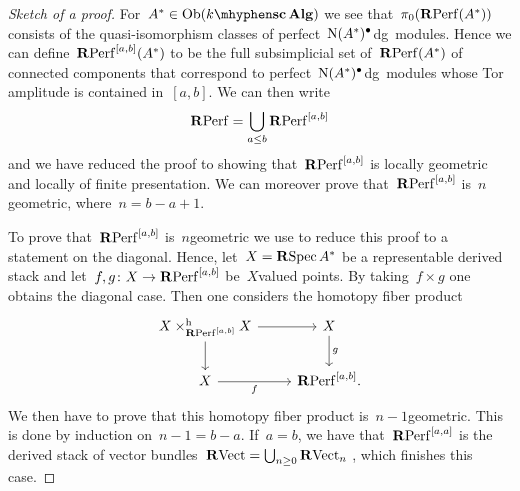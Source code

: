 \begin{refsection}
\begin{theorem}
\begin{proof}[Sketch of a proof]
    For~$A^*\in\Ob(\scAlg{k})$ we see that~$\pi_0(\mathbf{R}\mathrm{Perf}(A^*))$ consists of the quasi-isomorphism classes of perfect~$\operatorname{N}(A^*)^\bullet$\dash dg~modules. Hence we can define~$\mathbf{R}\mathrm{Perf}^{[a,b]}(A^*)$ to be the full subsimplicial set of~$\mathbf{R}\mathrm{Perf}(A^*)$ of connected components that correspond to perfect~$\operatorname{N}(A^*)^\bullet$\dash dg~modules whose Tor amplitude is contained in~$[a,b]$. We can then write
    \begin{equation}
      \mathbf{R}\mathrm{Perf}=\bigcup_{a\leq b}\mathbf{R}\mathrm{Perf}^{[a,b]}
    \end{equation}
    and we have reduced the proof to showing that~$\mathbf{R}\mathrm{Perf}^{[a,b]}$ is locally geometric and locally of finite presentation. We can moreover prove that~$\mathbf{R}\mathrm{Perf}^{[a,b]}$ is~$n$\dash geometric, where~$n=b-a+1$.

    To prove that~$\mathbf{R}\mathrm{Perf}^{[a,b]}$ is~$n$\dash geometric we use \cite[lemma 2.18]{toen-vaquie-moduli-of-objects-in-dg-categories} to reduce this proof to a statement on the diagonal. Hence, let~$X=\operatorname{\mathbf{R}Spec} A^*$ be a representable derived stack and let~$f,g\colon X\to\mathbf{R}\mathrm{Perf}^{[a,b]}$ be~$X$\dash valued points. By taking~$f\times g$ one obtains the diagonal case. Then one considers the homotopy fiber product
    \begin{equation}
      \begin{tikzcd}
        X\times_{\RPerf^{[a,b]}}^{\mathrm{h}}X \arrow{r} \arrow{d} & X \arrow{d}{g} \\
        X \arrow[swap]{r}{f} & \RPerf^{[a,b]}.
      \end{tikzcd}
    \end{equation}
    We then have to prove that this homotopy fiber product is~$n-1$\dash geometric. This is done by induction on~$n-1=b-a$. If~$a=b$, we have that~$\mathbf{R}\mathrm{Perf}^{[a,a]}$ is the derived stack of vector bundles~$\mathbf{R}\mathrm{Vect}=\bigcup_{n\geq 0}\mathbf{R}\mathrm{Vect}_n$ \cite[corollary 1.3.7.4]{toen-vezzosi-hag-II}, which finishes this case.


\end{proof}
\end{theorem}
\end{refsection}
